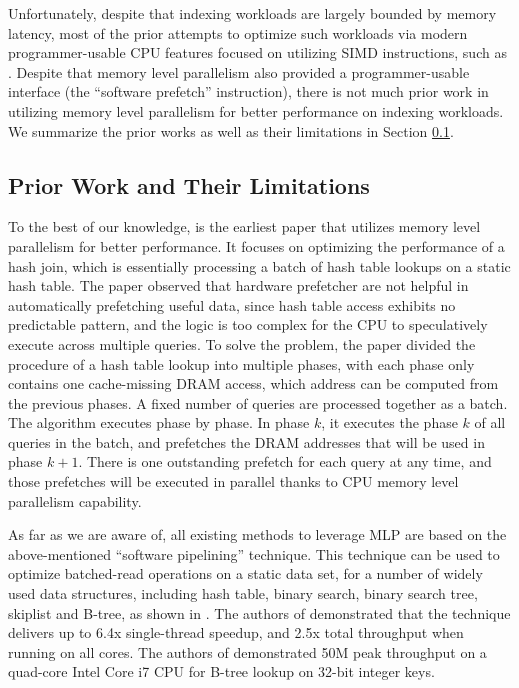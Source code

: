 \documentclass[11pt, usletter]{article}
\begin{document}
Unfortunately, despite that indexing workloads are largely bounded by memory latency, 
most of the prior attempts to optimize such workloads via modern programmer-usable CPU features 
focused on utilizing SIMD instructions, such as \cite{fast_sigmod10, arttrie_icde13, masstree, hot_sigmod18}.
Despite that memory level parallelism also provided a programmer-usable interface (the ``software prefetch'' instruction), 
there is not much prior work in utilizing memory level parallelism for better performance on indexing workloads. 
We summarize the prior works as well as their limitations in Section \ref{relwork}.

\subsection{Prior Work and Their Limitations} \label{relwork}


To the best of our knowledge,
\cite{hashjoin_icde04} is the earliest paper that utilizes memory level parallelism for better performance. 
It focuses on optimizing the performance of a hash join, which is essentially processing a batch of hash table lookups on a static hash table. 
The paper observed that hardware prefetcher are not helpful in automatically prefetching useful data, 
since hash table access exhibits no predictable pattern, 
and the logic is too complex for the CPU to speculatively execute across multiple queries.
To solve the problem, the paper divided the procedure of a hash table lookup into multiple phases, 
with each phase only contains one cache-missing DRAM access, which address can be computed from the previous phases.
A fixed number of queries are processed together as a batch. 
The algorithm executes phase by phase. In phase $k$, it executes the phase $k$ of all queries in the batch, 
and prefetches the DRAM addresses that will be used in phase $k+1$.
There is one outstanding prefetch for each query at any time, 
and those prefetches will be executed in parallel thanks to CPU memory level parallelism capability.

As far as we are aware of, all existing methods to leverage MLP are based on the above-mentioned ``software pipelining'' technique.
This technique can be used to optimize batched-read operations on a static data set, for a number of widely used data structures, 
including hash table, binary search, binary search tree, skiplist and B-tree, as shown in \cite{cimple_pact18, fast_sigmod10}.
The authors of \cite{cimple_pact18} demonstrated that the technique delivers up to 6.4x single-thread speedup, 
and 2.5x total throughput when running on all cores. 
The authors of \cite{fast_sigmod10} demonstrated 50M peak throughput 
on a quad-core Intel Core i7 CPU for B-tree lookup on 32-bit integer keys.
\end{document}
